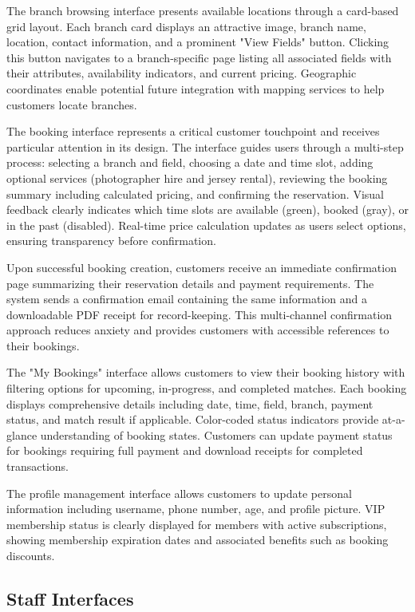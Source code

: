 The branch browsing interface presents available locations through a card-based grid layout. Each branch card displays an attractive image, branch name, location, contact information, and a prominent "View Fields" button. Clicking this button navigates to a branch-specific page listing all associated fields with their attributes, availability indicators, and current pricing. Geographic coordinates enable potential future integration with mapping services to help customers locate branches.

The booking interface represents a critical customer touchpoint and receives particular attention in its design. The interface guides users through a multi-step process: selecting a branch and field, choosing a date and time slot, adding optional services (photographer hire and jersey rental), reviewing the booking summary including calculated pricing, and confirming the reservation. Visual feedback clearly indicates which time slots are available (green), booked (gray), or in the past (disabled). Real-time price calculation updates as users select options, ensuring transparency before confirmation.

Upon successful booking creation, customers receive an immediate confirmation page summarizing their reservation details and payment requirements. The system sends a confirmation email containing the same information and a downloadable PDF receipt for record-keeping. This multi-channel confirmation approach reduces anxiety and provides customers with accessible references to their bookings.

The "My Bookings" interface allows customers to view their booking history with filtering options for upcoming, in-progress, and completed matches. Each booking displays comprehensive details including date, time, field, branch, payment status, and match result if applicable. Color-coded status indicators provide at-a-glance understanding of booking states. Customers can update payment status for bookings requiring full payment and download receipts for completed transactions.

The profile management interface allows customers to update personal information including username, phone number, age, and profile picture. VIP membership status is clearly displayed for members with active subscriptions, showing membership expiration dates and associated benefits such as booking discounts.

\subsection{Staff Interfaces}

